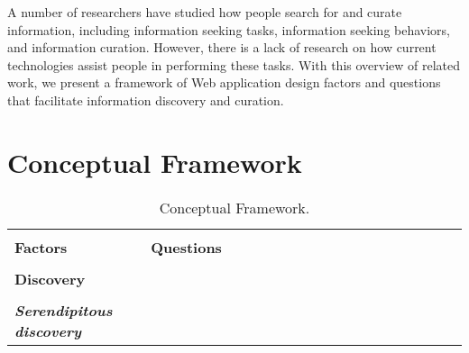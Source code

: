 \documentclass{casconpaper}
\begin{document}
{A number of researchers have studied how people search for and curate information, including information seeking tasks, information seeking behaviors, and information curation. However, there is a lack of research on how current technologies assist people in performing these tasks. With this overview of related work, we present a framework of Web application design factors and questions that facilitate information discovery and curation.
} %




{\section{Conceptual Framework}
\begin{table*}[htbp]
\caption{Conceptual Framework.}
\centering
\begin{tabular}{|p{0.30\linewidth}|p{0.70\linewidth}|}
\hline
&\\
\textbf{\large{Factors}}   & \textbf{\large{Questions}}  \\
\hline
&\\
\textbf{\large{Discovery}}                     &                                                                                                           \\

&\\
\emph{\textbf{Serendipitous discovery}}     &                                                                                                           \\


\end{tabular}
\end{table*}}
\end{document}

